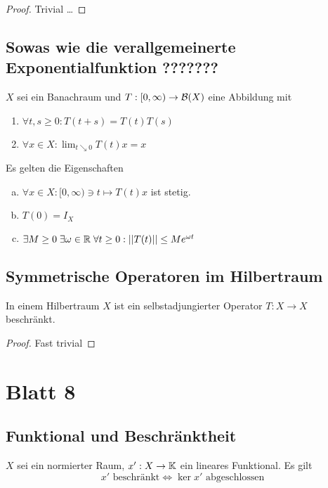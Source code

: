 \documentclass[FunkAnaSkriptSS2017.tex]{subfiles} %
\begin{document}
	\begin{proof}
	Trivial \dots
	\end{proof}


\subsection{ Sowas wie die verallgemeinerte Exponentialfunktion ???????}
	$X$ sei ein Banachraum und $T:[0,\infty ) \to \mathcal{B}(X)$ eine Abbildung mit
	\begin{enumerate}
		\item $\forall t,s \geq 0 : T(t+s) = T(t)T(s)$
		\item $\forall x\in X : \lim_{t\searrow 0} T(t)x = x$
	\end{enumerate}
	Es gelten die Eigenschaften
	\begin{enumerate}[(a)]
		\item $\forall x \in X :[0,\infty) \ni t \mapsto T(t)x$ ist stetig.
		\item $T(0) = I_X$
		\item $\exists M \geq 0 \; \exists \omega \in \mathbb{R} \; \forall t \geq 0 : \left\lvert \left\lvert T(t) \right\rvert \right\rvert \leq M e^{\omega t}$
	\end{enumerate}


\subsection{ Symmetrische Operatoren im Hilbertraum }
	In einem Hilbertraum $X$ ist ein selbstadjungierter Operator $T : X\to X$ beschränkt.
	
	\begin{proof}
	Fast trivial
	\end{proof}		
	
	
	
\newpage
\section{ Blatt 8}


\subsection{ Funktional und Beschränktheit}
	$X$ sei ein normierter Raum, $x' : X\to \mathbb{K}$ ein lineares Funktional. Es gilt
	$$x' \text{ beschränkt} \Leftrightarrow \ker x' \text{ abgeschlossen}$$
\end{document}
